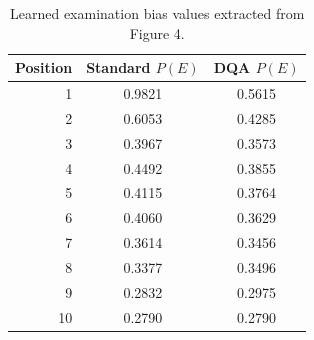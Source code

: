 \begin{table}[htbp]
\centering
\caption{Learned examination bias values extracted from Figure 4.}
\label{tab:learned-bias-values}
\begin{tabular}{rcc}
\hline
Position & Standard $P(E)$ & DQA $P(E)$ \\
\hline
1 & 0.9821 & 0.5615 \\
2 & 0.6053 & 0.4285 \\
3 & 0.3967 & 0.3573 \\
4 & 0.4492 & 0.3855 \\
5 & 0.4115 & 0.3764 \\
6 & 0.4060 & 0.3629 \\
7 & 0.3614 & 0.3456 \\
8 & 0.3377 & 0.3496 \\
9 & 0.2832 & 0.2975 \\
10 & 0.2790 & 0.2790 \\
\hline
\end{tabular}
\end{table}
